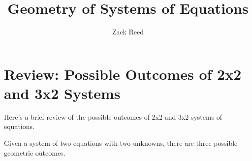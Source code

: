 \documentclass{ximera}
\author{Zack Reed} %
\title{Geometry of Systems of Equations}
\begin{document}
\begin{abstract}

\end{abstract}
\maketitle
    

     
    \section*{Review: Possible Outcomes of 2x2 and 3x2 Systems}
    
      Here's a brief review of the possible outcomes of 2x2 and 3x2 systems of equations.
       
      Given a system of two equations with two unknowns, there are three possible geometric outcomes. 
      
\end{document}
